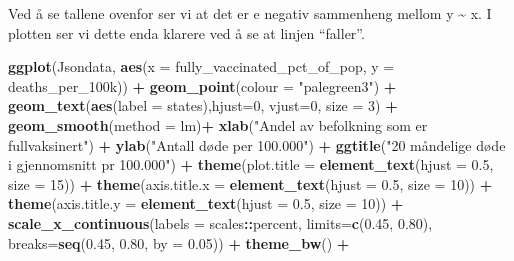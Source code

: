 \documentclass[
]{article}
\newenvironment{Shaded}{\begin{snugshade}}{\end{snugshade}}
\newcommand{\DataTypeTok}[1]{\textcolor[rgb]{0.13,0.29,0.53}{#1}}
\newcommand{\DecValTok}[1]{\textcolor[rgb]{0.00,0.00,0.81}{#1}}
\newcommand{\FloatTok}[1]{\textcolor[rgb]{0.00,0.00,0.81}{#1}}
\newcommand{\KeywordTok}[1]{\textcolor[rgb]{0.13,0.29,0.53}{\textbf{#1}}}
\newcommand{\NormalTok}[1]{#1}
\newcommand{\OperatorTok}[1]{\textcolor[rgb]{0.81,0.36,0.00}{\textbf{#1}}}
\newcommand{\StringTok}[1]{\textcolor[rgb]{0.31,0.60,0.02}{#1}}
\begin{document}
Ved å se tallene ovenfor ser vi at det er e negativ sammenheng mellom y
\textasciitilde{} x. I plotten ser vi dette enda klarere ved å se at
linjen ``faller''.

\begin{Shaded}
\begin{Highlighting}[]
\KeywordTok{ggplot}\NormalTok{(Jsondata, }\KeywordTok{aes}\NormalTok{(}\DataTypeTok{x =}\NormalTok{ fully_vaccinated_pct_of_pop, }\DataTypeTok{y =}\NormalTok{ deaths_per_100k)) }\OperatorTok{+}\StringTok{ }
\StringTok{  }\KeywordTok{geom_point}\NormalTok{(}\DataTypeTok{colour =} \StringTok{"palegreen3"}\NormalTok{) }\OperatorTok{+}\StringTok{ }
\StringTok{  }\KeywordTok{geom_text}\NormalTok{(}\KeywordTok{aes}\NormalTok{(}\DataTypeTok{label =}\NormalTok{ states),}\DataTypeTok{hjust=}\DecValTok{0}\NormalTok{, }\DataTypeTok{vjust=}\DecValTok{0}\NormalTok{, }\DataTypeTok{size =} \DecValTok{3}\NormalTok{) }\OperatorTok{+}
\StringTok{  }\KeywordTok{geom_smooth}\NormalTok{(}\DataTypeTok{method =}\NormalTok{ lm)}\OperatorTok{+}
\StringTok{  }\KeywordTok{xlab}\NormalTok{(}\StringTok{"Andel av befolkning som er fullvaksinert"}\NormalTok{) }\OperatorTok{+}\StringTok{ }
\StringTok{  }\KeywordTok{ylab}\NormalTok{(}\StringTok{"Antall døde per 100.000"}\NormalTok{) }\OperatorTok{+}
\StringTok{  }\KeywordTok{ggtitle}\NormalTok{(}\StringTok{"20 måndelige døde i gjennomsnitt pr 100.000"}\NormalTok{) }\OperatorTok{+}\StringTok{ }
\StringTok{  }\KeywordTok{theme}\NormalTok{(}\DataTypeTok{plot.title =} \KeywordTok{element_text}\NormalTok{(}\DataTypeTok{hjust =} \FloatTok{0.5}\NormalTok{, }\DataTypeTok{size =} \DecValTok{15}\NormalTok{)) }\OperatorTok{+}
\StringTok{  }\KeywordTok{theme}\NormalTok{(}\DataTypeTok{axis.title.x =} \KeywordTok{element_text}\NormalTok{(}\DataTypeTok{hjust =} \FloatTok{0.5}\NormalTok{, }\DataTypeTok{size =} \DecValTok{10}\NormalTok{)) }\OperatorTok{+}
\StringTok{  }\KeywordTok{theme}\NormalTok{(}\DataTypeTok{axis.title.y =} \KeywordTok{element_text}\NormalTok{(}\DataTypeTok{hjust =} \FloatTok{0.5}\NormalTok{, }\DataTypeTok{size =} \DecValTok{10}\NormalTok{)) }\OperatorTok{+}
\StringTok{  }\KeywordTok{scale_x_continuous}\NormalTok{(}\DataTypeTok{labels =}\NormalTok{ scales}\OperatorTok{::}\NormalTok{percent, }\DataTypeTok{limits=}\KeywordTok{c}\NormalTok{(}\FloatTok{0.45}\NormalTok{, }\FloatTok{0.80}\NormalTok{), }\DataTypeTok{breaks=}\KeywordTok{seq}\NormalTok{(}\FloatTok{0.45}\NormalTok{, }\FloatTok{0.80}\NormalTok{, }\DataTypeTok{by =} \FloatTok{0.05}\NormalTok{)) }\OperatorTok{+}\StringTok{ }
\StringTok{  }\KeywordTok{theme_bw}\NormalTok{() }\OperatorTok{+}\StringTok{ }

\end{Highlighting}
\end{Shaded}
\end{document}
